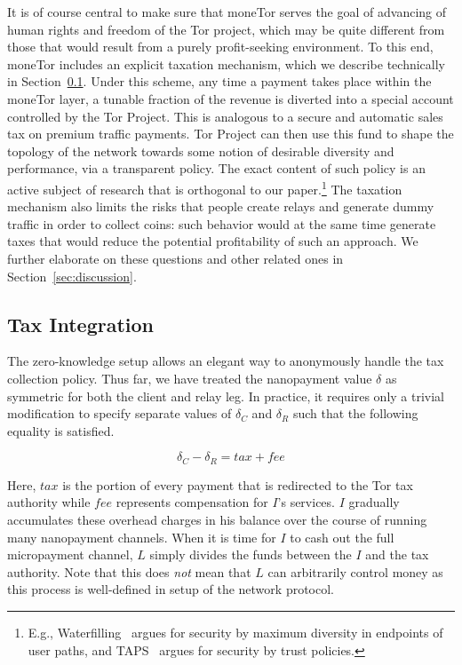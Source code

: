 It is of course central to make sure that moneTor serves the goal of advancing of human rights and freedom of the Tor project, which may be quite different from those that would result from a purely profit-seeking environment.
To this end, moneTor includes an explicit taxation mechanism, which we describe technically in Section~\ref{sec:tax_integration}.
Under this scheme, any time a payment takes place within the moneTor layer, a tunable fraction of the revenue is diverted into a special account controlled by the Tor Project.
This is analogous to a secure and automatic sales tax on premium traffic payments.
Tor Project can then use this fund to shape the topology of the network towards some notion of desirable diversity and performance, via a transparent policy.
The exact content of such policy is an active subject of research that is orthogonal to our paper.\footnote{E.g., Waterfilling~\cite{waterfilling-pets2017} argues for security by maximum diversity in endpoints of user paths, and TAPS~\cite{taps-ndss2017} argues for security by trust policies.}
The taxation mechanism also limits the risks that people create relays and generate dummy traffic in order to collect coins: such behavior would at the same time generate taxes that would reduce the potential profitability of such an approach.
We further elaborate on these questions and other related ones in Section~\ref{sec:discussion}.

\subsection{Tax Integration}
\label{sec:tax_integration}

The zero-knowledge setup allows an elegant way to anonymously handle the tax collection policy.
Thus far, we have treated the nanopayment value $\delta$ as symmetric for both the client and relay leg.
In practice, it requires only a trivial modification to specify separate values of $\delta_C$ and $\delta_R$ such that the following equality is satisfied.

\begin{equation}
  \delta_C - \delta_R = \mathit{tax} + \mathit{fee}
  \label{eq:payment}
\end{equation}

\medskip \noindent Here, $\mathit{tax}$ is the portion of every payment that is redirected to the Tor tax authority while $\mathit{fee}$ represents compensation for $I$'s services.
$I$ gradually accumulates these overhead charges in his balance over the course of running many nanopayment channels.
When it is time for $I$ to cash out the full micropayment channel, $L$ simply divides the funds between the $I$ and the tax authority.
Note that this does \emph{not} mean that $L$ can arbitrarily control money as this process is well-defined in setup of the network protocol.

